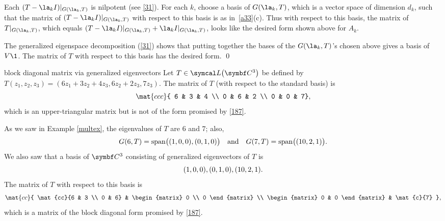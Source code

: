 \proof
Each $(T - \la_k I)|_{G(\la_k, T)}$ is nilpotent (see \ref{31}).  For each $k$,
choose a basis of $G(\la_k, T)$, which is a vector space of dimension $d_k$, such that the matrix of $(T - \la_k I)|_{G(\la_k, T)}$
with respect to this basis is as in~\ref{a33}(c).  Thus with respect to this basis, the matrix of
$T|_{G(\la_k, T)}$, which equals $(T - \la_k I)|_{G(\la_k, T)} + \la_k I|_{G(\la_k, T)}$, looks like the desired form shown above for $A_k$.

The generalized eigenspace decomposition (\ref{31}) shows that putting together the bases of the $G(\la_k, T)$'s chosen above gives a basis of $V\1$.  The matrix of $T$ with respect to this basis has the desired form.
\qed

\begin{example}[decompex]{block diagonal matrix via generalized eigenvectors}
Let $T \in \L\paren[\big]{\C{3}}$ be defined by
$
T(z_1, z_2, z_3) = (6z_1 + 3z_2 + 4z_3, 6z_2 + 2z_3, 7z_3)$.
The matrix of $T$ (with respect to the standard basis) is
\[
\mat{ccc}{ 6 & 3 & 4 \\
0 & 6 & 2 \\
0 & 0 & 7},
\]
which is an upper-triangular matrix but is not of the form promised by \ref{187}.

As we saw in Example \ref{multex}, the eigenvalues of $T$ are $6$ and $7$; also,
\[
G(6, T)  =
\operatorname{span}\bigl( (1, 0, 0), (0, 1, 0) \bigr) \quad \text{and} \quad
G(7, T) = \operatorname{span}\bigl( (10, 2, 1) \bigr).
\]
We also saw that a basis of $\C3$ consisting of generalized eigenvectors of $T$ is
\vspace{-.01in} %
\[
(1, 0, 0), (0, 1, 0), (10, 2, 1).
\vspace{-.01in} %
\]
The matrix of $T$ with respect to this basis is
\[
\mat{cc}{
\mat{cc}{6 & 3 \\ 0 & 6} & \begin{matrix} 0 \\ 0 \end{matrix} \\
\begin{matrix} 0 & 0 \end{matrix} & \mat{c}{7}
},
\]
which is a matrix of the block diagonal form promised by \ref{187}.
\end{example}

\pagebreak[3]

